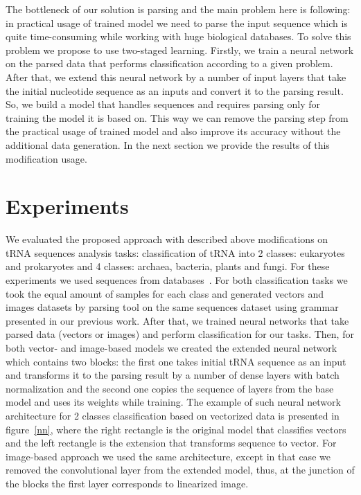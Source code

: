 \documentclass[12pt,a4paper]{cibb}
\begin{document}
The bottleneck of our solution is parsing and the main problem here is following: in practical usage of trained model we need to parse the input sequence which is quite time-consuming while working with huge biological databases. To solve this problem we propose to use two-staged learning. Firstly, we train a neural network on the parsed data that performs classification according to a given problem. After that, we extend this neural network by a number of input layers that take the initial nucleotide sequence as an inputs and convert it to the parsing result. So, we build a model that handles sequences and requires parsing only for training the model it is based on. This way we can remove the parsing step from the practical usage of trained model and also improve its accuracy without the additional data generation. In the next section we provide the results of this modification usage.


\section{\bf Experiments}
We evaluated the proposed approach with described above modifications on tRNA sequences analysis tasks: classification of tRNA into 2 classes: eukaryotes and prokaryotes and 4 classes: archaea, bacteria, plants and fungi. For these experiments we used sequences from databases~\cite{trnadb1,trnadb2}. For both classification tasks we took the equal amount of samples for each class and generated vectors and images datasets by parsing tool on the same sequences dataset using grammar presented in our previous work. After that, we trained neural networks that take parsed data (vectors or images) and perform classification for our tasks. Then, for both vector- and image-based models we created the extended neural network which contains two blocks: the first one takes initial tRNA sequence as an input and transforms it to the parsing result by a number of dense layers with batch normalization and the second one copies the sequence of layers from the base model and uses its weights while training. The example of such neural network architecture for 2 classes classification based on vectorized data is presented in figure~\ref{nn}, where the right rectangle is the original model that classifies vectors and the left rectangle is the extension that transforms sequence to vector. For image-based approach we used the same architecture, except in that case we removed the convolutional layer from the extended model, thus, at the junction of the blocks the first layer corresponds to linearized image.
\end{document}
